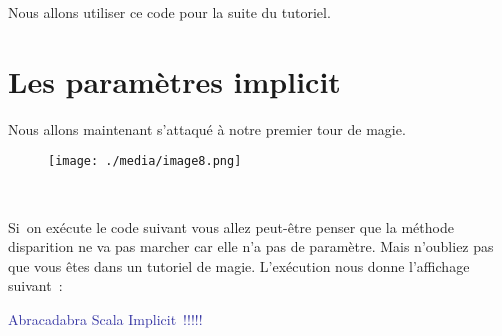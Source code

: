 \documentclass[12pt]{article}
\begin{document}
\vspace{\baselineskip}
Nous allons utiliser ce code pour la suite du tutoriel.\par

 \par

\section*{Les paramètres implicit}

\vspace{\baselineskip}
Nous allons maintenant s’attaqué à notre premier tour de magie. \par


\vspace{\baselineskip}



\begin{figure}[H]
	\begin{Center}
		\texttt{[image: ./media/image8.png]}
	\end{Center}
\end{figure}



\begin{Center}
\ \ \ \ \ \ \ \ \ \ \ \ \ \ \ \ \ \ \ \ \ \ \ \ \ \ \ \ \ \ \ \ \ \ \ \ \ \
\end{Center}\par


\vspace{\baselineskip}
Si\ on exécute le code suivant vous allez peut-être penser que la méthode disparition ne va pas marcher car elle n’a pas de paramètre.  Mais n’oubliez pas que vous êtes dans un tutoriel de magie. L’exécution nous donne l’affichage suivant :\par


\vspace{\baselineskip}
\begin{Center}
{\fontsize{28pt}{33.6pt}\selectfont \textcolor[HTML]{3030A0}{Abracadabra Scala Implicit !!!!!}\par}
\end{Center}\par


\vspace{\baselineskip}
\end{document}
